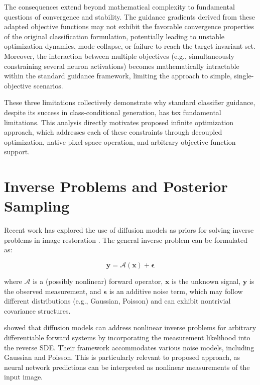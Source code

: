 The consequences extend beyond mathematical complexity to fundamental questions of convergence and stability. The guidance gradients derived from these adapted objective functions may not exhibit the favorable convergence properties of the original classification formulation, potentially leading to unstable optimization dynamics, mode collapse, or failure to reach the target invariant set. Moreover, the interaction between multiple objectives (e.g., simultaneously constraining several neuron activations) becomes mathematically intractable within the standard guidance framework, limiting the approach to simple, single-objective scenarios.

These three limitations collectively demonstrate why standard classifier guidance, despite its success in class-conditional generation, has tsx fundamental limitations. This analysis directly motivates proposed infinite optimization approach, which addresses each of these constraints through decoupled optimization, native pixel-space operation, and arbitrary objective function support.

\section{Inverse Problems and Posterior Sampling}

Recent work has explored the use of diffusion models as priors for solving inverse problems in image restoration \citep{song2023pseudoinverse, chung2024diffusionposteriorsamplinggeneral}. The general inverse problem can be formulated as:

\begin{equation}
\mathbf{y} = \mathcal{A}(\mathbf{x}) + \boldsymbol{\epsilon}
\label{eq:inverse_problem}
\end{equation}

where $\mathcal{A}$ is a (possibly nonlinear) forward operator, $\mathbf{x}$ is the unknown signal, $\mathbf{y}$ is the observed measurement, and $\boldsymbol{\epsilon}$ is an additive noise term, which may follow different distributions (e.g., Gaussian, Poisson) and can exhibit nontrivial covariance structures.

\citep{chung2024diffusionposteriorsamplinggeneral} showed that diffusion models can address nonlinear inverse problems for arbitrary differentiable forward systems by incorporating the measurement likelihood into the reverse SDE. Their framework accommodates various noise models, including Gaussian and Poisson. This is particularly relevant to proposed approach, as neural network predictions can be interpreted as nonlinear measurements of the input image.

